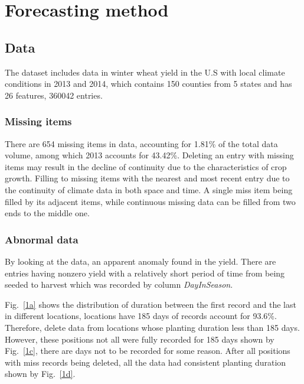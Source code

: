 \documentclass[conference]{IEEEtran}
\begin{document}
\section{Forecasting method} \label{sec:fm}
  \subsection{Data} 
      The dataset includes data in winter wheat yield in the U.S with local climate conditions in 2013 and 2014, which contains 150 counties from 5 states and has 26 features, 360042 entries.

    \subsubsection{Missing items}
      There are 654 missing items in data, accounting for 1.81\% of the total data volume, among which 2013 accounts for 43.42\%. Deleting an entry with missing items may result in the decline of continuity due to the characteristics of crop growth. Filling to missing items with the nearest and most recent entry due to the continuity of climate data in both space and time. A single miss item being filled by its adjacent items, while continuous missing data can be filled from two ends to the middle one.

    \subsubsection{Abnormal data}
      By looking at the data, an apparent anomaly found in the yield. There are entries having nonzero yield with a relatively short period of time from being seeded to harvest which was recorded by column \textit{DayInSeason}.  

      Fig.~\ref{1a} shows the distribution of duration between the first record and the last in different locations, locations have 185 days of records account for 93.6\%. Therefore, delete data from locations whose planting duration less than 185 days. However, these positions not all were fully recorded for 185 days shown by Fig.~\ref{1c}, there are days not to be recorded for some reason. After all positions with miss records being deleted, all the data had consistent planting duration shown by Fig.~\ref{1d}.
\end{document}
